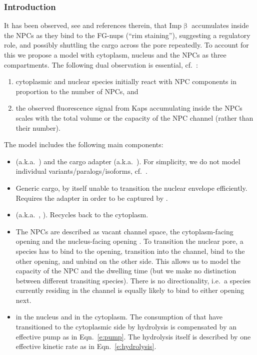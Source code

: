 \documentclass[12pt,notitlepage]{article}
\begin{document}
\subsubsection*{Introduction}

It has been observed,
see
\cite{KalitaKapinosLim2021} and references therein,
that Imp$\upbeta$ accumulates 
inside the NPCs
as they bind to the FG-nups (``rim staining''),
suggesting a regulatory role,
and
possibly shuttling
the cargo across the pore
repeatedly.
%
%
To account for this
we propose
a model
with cytoplasm, nucleus
and
the NPCs 
as three compartments.
%
%
The following dual observation is essential, cf.~\cite[\S10]{Hofmeyr2020}:
%
\begin{enumerate}
\item 
	cytoplasmic and nuclear species initially react 
	with NPC components in proportion
	to the number of NPCs,
	and
\item
	the observed fluorescence signal
	from Kaps accumulating inside the NPCs
	scales with
	the total volume or the capacity of the NPC channel
	(rather than their number).
\end{enumerate}

%
%
%

The model includes the following main components:
%
\begin{itemize}
\item
	(a.k.a.~)
	and the cargo adapter
	(a.k.a.~).
	For simplicity,
	we do not model individual variants/paralogs/isoforms,
	cf.~\cite[p.~2]{KalitaKapinosLim2021}.
\item
	Generic  cargo,
	by itself unable to transition the nuclear envelope efficiently.
	Requires the  adapter
	in order to be captured by .
\item
	(a.k.a.~, ).
	Recycles  back to the cytoplasm.
\item
	The NPCs are described
	as
	vacant  channel space,
	the cytoplasm-facing opening 
	and
	the nucleus-facing opening .
	To transition the nuclear pore,
	a species has to bind to the opening,
	transition into the channel,
	bind to the other opening,
	and unbind on the other side.
	This allows us to model the capacity of the NPC
	and the dwelling time
	(but we make no distinction between different transiting species).
	There is no directionality,
	i.e.~a species currently residing in the channel is equally
	likely to bind to either opening next.
\item
	 in the nucleus and  in the cytoplasm.
	The consumption of 
	that have transitioned to the cytoplasmic side
	by hydrolysis
	is compensated by an effective pump
	as in Eqn.~\eqref{e:pump}.
	The hydrolysis itself is described by one 
	effective kinetic rate as in Eqn.~\eqref{e:hydrolysis}.
\end{itemize}
\end{document}
